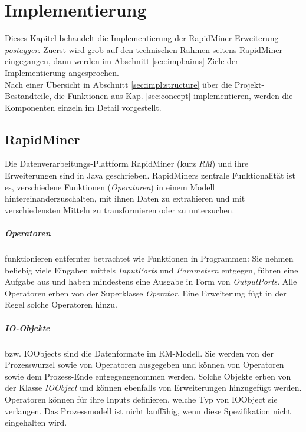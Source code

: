 %
\chapter{Implementierung}
\label{sec:impl}

Dieses Kapitel behandelt die Implementierung der RapidMiner-Erweiterung \textit{postagger}. Zuerst wird grob auf den technischen Rahmen seitens RapidMiner eingegangen, dann werden im Abschnitt \ref{sec:impl:aims} Ziele der Implementierung angesprochen. \\
Nach einer Übersicht in Abschnitt \ref{sec:impl:structure} über die Projekt-Bestandteile, die Funktionen aus Kap. \ref{sec:concept} implementieren, werden die Komponenten einzeln im Detail vorgestellt.

\section{RapidMiner}
\label{sec:impl:rm}


Die Datenverarbeitungs-Plattform RapidMiner (kurz \textit{RM}) und ihre Erweiterungen sind in Java geschrieben. RapidMiners zentrale Funktionalität ist es, verschiedene Funktionen (\textit{Operatoren}) in einem Modell hintereinanderzuschalten, mit ihnen Daten zu extrahieren und mit verschiedensten Mitteln zu transformieren oder zu untersuchen.

\paragraph{Operatoren} 
funktionieren entfernter betrachtet wie Funktionen in Programmen: Sie nehmen beliebig viele Eingaben mittels \textit{InputPorts} und \textit{Parametern} entgegen, führen eine Aufgabe aus und haben mindestens eine Ausgabe in Form von \textit{OutputPorts}. Alle Operatoren erben von der Superklasse \textit{Operator}. Eine Erweiterung fügt in der Regel solche Operatoren hinzu.
\paragraph{IO-Objekte}
bzw. IOObjects sind die Datenformate im RM-Modell. Sie werden von der Prozesswurzel sowie von Operatoren ausgegeben und können von Operatoren sowie dem Prozess-Ende entgegengenommen werden. Solche Objekte erben von der Klasse \textit{IOObject} und können ebenfalls von Erweiterungen hinzugefügt werden. Operatoren können für ihre Inputs definieren, welche Typ von IOObject sie verlangen. Das Prozessmodell ist nicht lauffähig, wenn diese Spezifikation nicht eingehalten wird.

